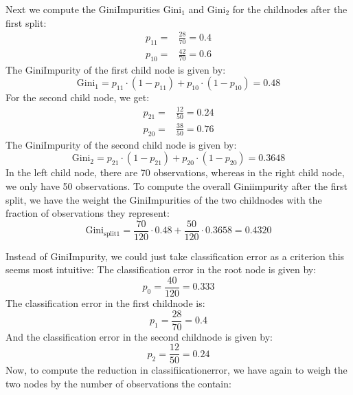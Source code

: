 \documentclass[letterpaper,10pt,english]{jupyterBook}
\begin{document}
\sphinxAtStartPar
Next we compute the Gini\sphinxhyphen{}Impurities \(\text{Gini}_1\) and \(\text{Gini}_2\) for the child\sphinxhyphen{}nodes after the first split:
\begin{eqnarray*}
p_{11} =& \frac{28}{70} = 0.4\\
p_{10} =& \frac{42}{70} = 0.6
\end{eqnarray*}
\sphinxAtStartPar
The Gini\sphinxhyphen{}Impurity of the first child node is given by:
\label{equation:Tree_Methods:fd6c44de-8439-4796-9e19-79ac3d755d44}\begin{equation}
\text{Gini}_{1} = p_{11}\cdot (1-p_{11}) + p_{10}\cdot (1-p_{10}) = 0.48
\end{equation}
\sphinxAtStartPar
For the second child node, we get:
\begin{eqnarray*}
p_{21} =& \frac{12}{50} = 0.24\\
p_{20} =& \frac{38}{50} = 0.76
\end{eqnarray*}
\sphinxAtStartPar
The Gini\sphinxhyphen{}Impurity of the second child node is given by:
\label{equation:Tree_Methods:ebd986fa-75a4-481b-9216-483ff272c057}\begin{equation}
\text{Gini}_{2} = p_{21}\cdot (1-p_{21}) + p_{20}\cdot (1-p_{20}) = 0.3648
\end{equation}
\sphinxAtStartPar
In the left child node, there are 70 observations, whereas in the right child node, we only have 50 observations. To compute the overall Gini\sphinxhyphen{}impurity after the first split, we have the weight the Gini\sphinxhyphen{}Impurities of the two child\sphinxhyphen{}nodes with the fraction of observations they represent:
\label{equation:Tree_Methods:7a93fe22-5164-436c-8a89-43a24eb7d1d0}\begin{equation}
\text{Gini}_{\text{split1}} = \frac{70}{120} \cdot 0.48 + \frac{50}{120} \cdot 0.3658 = 0.4320
\end{equation}


\sphinxAtStartPar
Instead of Gini\sphinxhyphen{}Impurity, we could just take classification error as a criterion \sphinxhyphen{} this seems most intuitive:
The classification error in the root node is given by:
\label{equation:Tree_Methods:f5347641-3775-4b8f-97af-516f30a657c6}\begin{equation}
p_0 = \frac{40}{120} = \mathbf{0.333}
\end{equation}
\sphinxAtStartPar
The classification error in the first child\sphinxhyphen{}node is:
\label{equation:Tree_Methods:510fa1fa-cc82-41bb-99db-a54431f8ad5f}\begin{equation}
p_1 = \frac{28}{70} = 0.4
\end{equation}
\sphinxAtStartPar
And the classification error in the second child\sphinxhyphen{}node is given by: 
\label{equation:Tree_Methods:f3dee4ec-c287-474e-bf67-333339dc1c82}\begin{equation}
p_2 = \frac{12}{50} = 0.24
\end{equation}
\sphinxAtStartPar
Now, to compute the reduction in classifiication\sphinxhyphen{}error, we have again to weigh the two nodes by the number of observations the contain:
\end{document}
